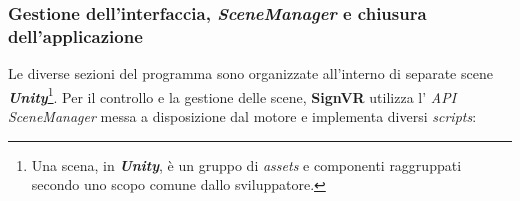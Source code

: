 \documentclass[12pt, a4paper]{article}
\begin{document}
        \subsubsection{Gestione dell'interfaccia, \textit{SceneManager} e chiusura dell'applicazione}
            Le diverse sezioni del programma sono organizzate all'interno di separate 
            scene \textit{\textbf{Unity}}\footnote
            {Una scena, in \textit{\textbf{Unity}}, è un gruppo di \textit{assets} e 
            componenti raggruppati secondo uno scopo comune dallo sviluppatore.}.
            Per il controllo e la gestione delle scene, \textbf{SignVR} utilizza l'
            \textit{API} \textit{SceneManager}
            messa a disposizione dal motore\cite{unity_manual_2026} e implementa diversi 
            \textit{scripts}:
\end{document}
